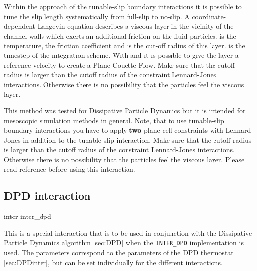 Within the approach of the tunable-slip boundary interactions it is
possible to tune the slip length systematically from full-slip to
no-slip.  A coordinate-dependent Langevin-equation describes a viscous
layer in the vicinity of the channel walls which exerts an additional
friction on the fluid particles.   is the temperature,
 the friction coefficient and  is
the cut-off radius of this layer.  is the timestep of
the integration scheme. With   and  it is
possible to give the layer a reference velocity to create a Plane
Couette Flow.  Make sure that the cutoff radius 
is larger than the cutoff radius of the constraint Lennard-Jones
interactions. Otherwise there is no possibility that the particles
feel the viscous layer.

This method was tested for Dissipative Particle Dynamics but it is
intended for mesoscopic simulation methods in general. Note, that to
use tunable-slip boundary interactions you have to apply \textbf{two}
plane cell constraints with Lennard-Jones in addition to the
tunable-slip interaction. Make sure that the cutoff radius
 is larger than the cutoff radius of the
constraint Lennard-Jones interactions. Otherwise there is no
possibility that the particles feel the viscous layer.  Please read
reference \cite{smiatek08a} before using this interaction.

\subsection{DPD interaction}\label{sec:DPDinter}

\begin{essyntax}
  inter   inter_dpd   
  \begin{features}
  \end{features}
\end{essyntax}

This is a special interaction that is to be used in conjunction with
the Dissipative Particle Dynamics algorithm \ref{sec:DPD} when the
\texttt{INTER_DPD} implementation is used. The parameters correspond
to the parameters of the DPD thermostat \vref{sec:DPDinter}, but
can be set individually for the different interactions.

